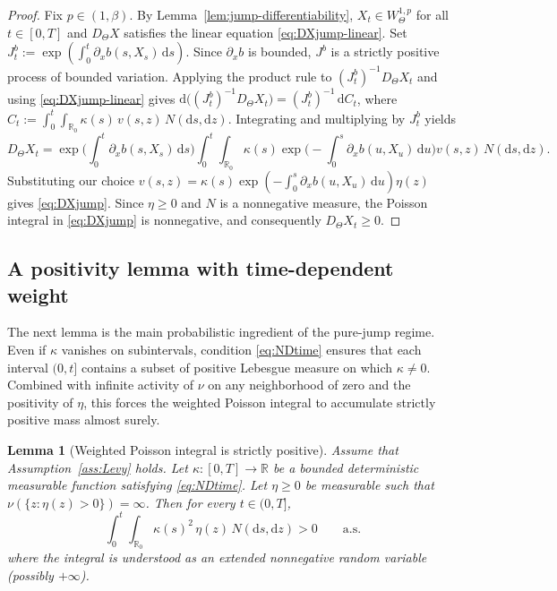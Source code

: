 \documentclass[11pt]{article}
\newcommand{\R}{\mathbb{R}}
\newcommand{\1}{\mathbf{1}}
\newcommand{\dd}{\mathrm{d}}
\theoremstyle{plain}
\newtheorem{lemma}[theorem]{Lemma}
\theoremstyle{definition}
\theoremstyle{remark}
\begin{document}
\begin{proof}
Fix $p\in(1,\beta)$.
By Lemma~\ref{lem:jump-differentiability}, $X_t\in W^{1,p}_\Theta$ for all $t\in[0,T]$ and $D_\Theta X$ satisfies the linear equation \eqref{eq:DXjump-linear}.
Set $J_t^b:=\exp(\int_0^t \partial_x b(s,X_s)\,\dd s)$.
Since $\partial_x b$ is bounded, $J^b$ is a strictly positive process of bounded variation.
Applying the product rule to $(J_t^b)^{-1}D_\Theta X_t$ and using \eqref{eq:DXjump-linear} gives $\dd\big((J_t^b)^{-1}D_\Theta X_t\big)=(J_t^b)^{-1}\,\dd C_t$,
where $C_t:=\int_0^t\int_{\R_0}\kappa(s)\,v(s,z)\,N(\dd s,\dd z)$.
Integrating and multiplying by $J_t^b$ yields
\[
D_\Theta X_t=\exp\Big(\int_0^t \partial_x b(s,X_s)\,\dd s\Big)\int_0^t\!\!\int_{\R_0}
\kappa(s)\exp\Big(-\int_0^s \partial_x b(u,X_u)\,\dd u\Big)v(s,z)\,N(\dd s,\dd z).
\]
Substituting our choice $v(s,z)=\kappa(s)\exp(-\int_0^s \partial_x b(u,X_u)\,\dd u)\eta(z)$ gives \eqref{eq:DXjump}.
Since $\eta\ge 0$ and $N$ is a nonnegative measure, the Poisson integral in \eqref{eq:DXjump} is nonnegative, and consequently $D_\Theta X_t\ge 0$.
\end{proof}

\subsection{A positivity lemma with time-dependent weight}

The next lemma is the main probabilistic ingredient of the pure-jump regime.
Even if $\kappa$ vanishes on subintervals, condition \eqref{eq:NDtime} ensures that each interval $(0,t]$ contains a subset of positive Lebesgue measure on which $\kappa\neq 0$.
Combined with infinite activity of $\nu$ on any neighborhood of zero and the positivity of $\eta$, this forces the weighted Poisson integral to accumulate strictly positive mass almost surely.

\begin{lemma}[Weighted Poisson integral is strictly positive]\label{lem:poisson-positive}
Assume that Assumption~\ref{ass:Levy} holds.
Let $\kappa:[0,T]\to\R$ be a bounded \emph{deterministic} measurable function satisfying \eqref{eq:NDtime}.
Let $\eta\ge 0$ be measurable such that $\nu(\{z:\eta(z)>0\})=\infty$.
Then for every $t\in(0,T]$,
\[
\int_0^t\int_{\R_0} \kappa(s)^2\,\eta(z)\,N(\dd s,\dd z) > 0
\qquad\text{a.s.}
\]
where the integral is understood as an extended nonnegative random variable (possibly $+\infty$).
\end{lemma}
\end{document}
